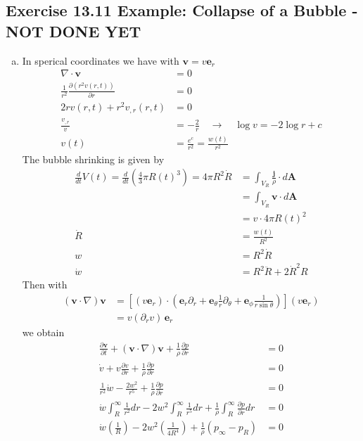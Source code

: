\documentclass[10pt,a4paper]{book}
\theoremstyle{definition}
\begin{document}
\subsection{Exercise 13.11 Example: Collapse of a Bubble  - NOT DONE YET}
\begin{enumerate}[(a)]
\item In sperical coordinates we have with $\mathbf{v}=v\mathbf{e}_r$
\begin{align}
\nabla\cdot\mathbf{v}&=0\\
\frac{1}{r^2}\frac{\partial (r^2 v(r,t))}{\partial r}&=0\\
2rv(r,t)+r^2v_{,r}(r,t)&=0\\
\frac{v_{,r}}{v}&=-\frac{2}{r}\quad\rightarrow\quad \log v=-2\log r+c\\
v(t)&=\frac{e^c}{r^2}=\frac{w(t)}{r^2}
\end{align}
The bubble shrinking is given by
\begin{align}
\frac{d}{dt}V(t)
=\frac{d}{dt}\left(\frac{4}{3}\pi R(t)^3\right)
=4\pi R^2\dot{R}
&=\int_{V_R} \frac{\mathbf{j}}{\rho}\cdot d\mathbf{A}\\
&=\int_{V_R} \mathbf{v}\cdot d\mathbf{A}\\
&=v\cdot 4\pi R(t)^2\\
\dot{R}&=\frac{w(t)}{R^2}\\
w&=R^2\dot{R}\\
\dot{w}&=R^2\ddot{R}+2\dot{R}^2R
\end{align}
Then with
\begin{align}
(\mathbf{v}\cdot\nabla)\mathbf{v}
&=\left[(v\mathbf{e}_r)\cdot\left(\mathbf{e}_r\partial_r+\mathbf{e}_\theta\frac{1}{r}\partial_\theta+\mathbf{e}_\phi\frac{1}{r\sin\theta}\right)\right](v\mathbf{e}_r)\\
&=v(\partial_r v)\,\mathbf{e}_r
\end{align}
we obtain
\begin{align}
\frac{\partial\mathbf{v}}{\partial t}+(\mathbf{v}\cdot\nabla)\mathbf{v}+\frac{1}{\rho}\frac{\partial p}{\partial r}&=0\\
\dot{v}+v\frac{\partial v}{\partial r}+\frac{1}{\rho}\frac{\partial p}{\partial r}&=0\\
\frac{1}{r^2}\dot{w}-\frac{2w^2}{r^5}+\frac{1}{\rho}\frac{\partial p}{\partial r}&=0\\
\dot{w}\int_R^\infty\frac{1}{r^2}dr-2w^2\int_R^\infty\frac{1}{r^5}dr+\frac{1}{\rho}\int_R^\infty\frac{\partial p}{\partial r}dr&=0\\
\dot{w}\left(\frac{1}{R}\right)-2w^2\left(\frac{1}{4R^4}\right)+\frac{1}{\rho}(p_\infty-p_R)&=0

\end{align}
\end{enumerate}
\end{document}
